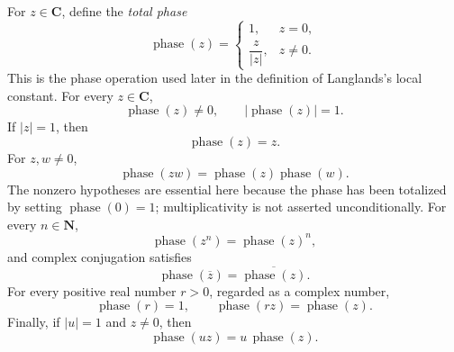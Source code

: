 \begin{definition}\label{mod:basic-phase}
For \(z\in\mathbf C\), define the \emph{total phase}
\[
 \operatorname{phase}(z)=
 \begin{cases}
  1,&z=0,\\[2mm]
  \dfrac{z}{\lvert z\rvert},&z\ne0.
 \end{cases}
\]
This is the phase operation used later in the definition of Langlands's
local constant.  For every \(z\in\mathbf C\),
\[
 \operatorname{phase}(z)\ne0,
 \qquad
 \bigl\lvert\operatorname{phase}(z)\bigr\rvert=1.
\]
If \(\lvert z\rvert=1\), then
\[
 \operatorname{phase}(z)=z.
\]
For \(z,w\ne0\),
\[
 \operatorname{phase}(zw)
 =\operatorname{phase}(z)\operatorname{phase}(w).
\]
The nonzero hypotheses are essential here because the phase has been
totalized by setting \(\operatorname{phase}(0)=1\); multiplicativity is
not asserted unconditionally.  For every \(n\in\mathbf N\),
\[
 \operatorname{phase}(z^n)=\operatorname{phase}(z)^n,
\]
and complex conjugation satisfies
\[
 \operatorname{phase}(\overline z)
 =\overline{\operatorname{phase}(z)}.
\]
For every positive real number \(r>0\), regarded as a complex number,
\[
 \operatorname{phase}(r)=1,
 \qquad
 \operatorname{phase}(rz)=\operatorname{phase}(z).
\]
Finally, if \(\lvert u\rvert=1\) and \(z\ne0\), then
\[
 \operatorname{phase}(uz)=u\,\operatorname{phase}(z).
\]
\leanok
{}
\FormalizationContract
\end{definition}
